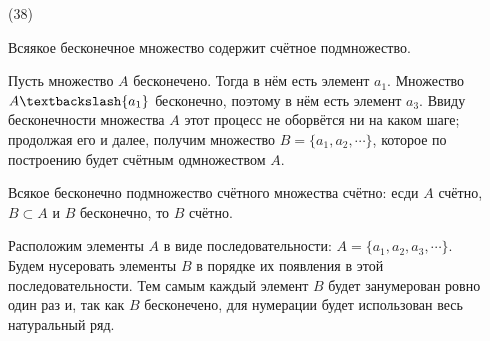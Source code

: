 (38)

\T Всяякое бесконечное множество содержит счётное подмножество.

\D Пусть множество $A$ бесконечено. Тогда в нём есть элемент $a_1$. Множество $A\bsl \{a_1\}$ бесконечно, поэтому в нём есть элемент $a_3$. Ввиду бесконечности множества $A$ этот процесс не оборвётся ни на каком шаге; продолжая его и далее, получим множество $B = \{a_1, a_2,\cdots\}$, которое по построению будет счётным одмножеством $A$.

\T Всякое бесконечно подмножество счётного множества счётно: есди $A$ счётно, $B \subset A$ и $B$ бесконечно, то $B$ счётно.

\D Расположим элементы $A$ в виде последовательности: $A =\{a_1, a_2, a_3, \cdots\}$.\\
Будем нусеровать элементы $B$ в порядке их появления в этой последовательности. Тем самым каждый элемент $B$ будет занумерован ровно один раз и, так как $B$ бесконечено, для нумерации будет использован весь натуральный ряд.